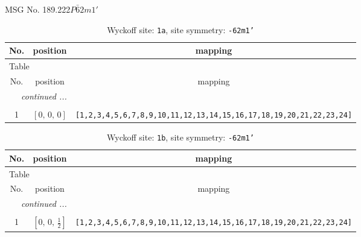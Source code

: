 \documentclass[fleqn,8pt]{jsarticle}
\begin{document}
\setcounter{MaxMatrixCols}{32}

\renewcommand{\tablename}{Table~}
\renewcommand{\figurename}{Figure~}
\begin{center}
\LARGE
MSG No. 189.222\quad$P\bar{6}2m1'$
\end{center}
\renewcommand{\arraystretch}{1.2}
\begin{longtable}{ccc}
\caption{Wyckoff site: {\tt 1a}, site symmetry: {\tt -62m1'}}
 \\
 \hline \hline
No. & position & mapping \\ \hline \endfirsthead

\multicolumn{2}{l}{\tablename\ \thetable{}} \\
 \hline \hline
No. & position & mapping \\ \hline \endhead

 \hline \hline
\multicolumn{2}{r}{\footnotesize\it continued ...} \\ \endfoot

 \hline \hline
\multicolumn{2}{r}{} \\ \endlastfoot

1 & $\left[ 0,\, 0,\, 0 \right]$ & {\tt [1,2,3,4,5,6,7,8,9,10,11,12,13,14,15,16,17,18,19,20,21,22,23,24]} \\
\end{longtable}
\renewcommand{\arraystretch}{1.2}
\begin{longtable}{ccc}
\caption{Wyckoff site: {\tt 1b}, site symmetry: {\tt -62m1'}}
 \\
 \hline \hline
No. & position & mapping \\ \hline \endfirsthead

\multicolumn{2}{l}{\tablename\ \thetable{}} \\
 \hline \hline
No. & position & mapping \\ \hline \endhead

 \hline \hline
\multicolumn{2}{r}{\footnotesize\it continued ...} \\ \endfoot

 \hline \hline
\multicolumn{2}{r}{} \\ \endlastfoot

1 & $\left[ 0,\, 0,\, \frac{1}{2} \right]$ & {\tt [1,2,3,4,5,6,7,8,9,10,11,12,13,14,15,16,17,18,19,20,21,22,23,24]} \\
\end{longtable}
\renewcommand{\arraystretch}{1.2}
\end{document}
